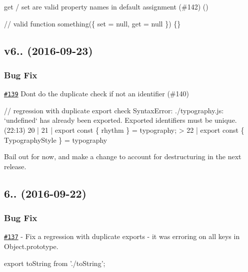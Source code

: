get / set are valid property names in default assignment (\#142) (\href{https://github.com/jezell}{\tt })


\begin{DoxyCode}
// valid
function something(\{ set = null, get = null \}) \{\}
\end{DoxyCode}


\subsection*{v6.. (2016-\/09-\/23)}

\subsubsection*{Bug Fix}


\begin{DoxyItemize}
\item \href{https://github.com/babel/babylon/issues/139}{\tt \#139} Don\textquotesingle{}t do the duplicate check if not an identifier (\#140) 
\end{DoxyItemize}


\begin{DoxyCode}
// regression with duplicate export check
SyntaxError: ./typography.js: `undefined` has already been exported. Exported identifiers must be unique.
       (22:13)
  20 |
  21 | export const \{ rhythm \} = typography;
> 22 | export const \{ TypographyStyle \} = typography
\end{DoxyCode}


Bail out for now, and make a change to account for destructuring in the next release.

\subsection*{6.. (2016-\/09-\/22)}

\subsubsection*{Bug Fix}


\begin{DoxyItemize}
\item \href{https://github.com/babel/babylon/pull/137}{\tt \#137} -\/ Fix a regression with duplicate exports -\/ it was erroring on all keys in {\ttfamily Object.\+prototype}. 
\end{DoxyItemize}


\begin{DoxyCode}
export toString from './toString';
\end{DoxyCode}



